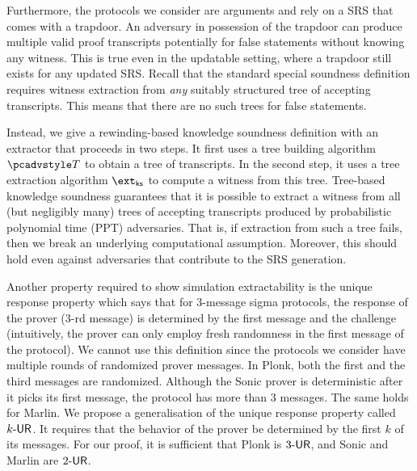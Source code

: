Furthermore, the protocols we consider are arguments and rely on a SRS that comes with a trapdoor. An adversary in
possession of the trapdoor can produce multiple valid proof transcripts potentially for false statements without
knowing any witness. This is true even in
the updatable setting, where a trapdoor still exists for any updated SRS. Recall
that the standard special soundness definition requires witness extraction from
\emph{any} suitably structured tree of accepting transcripts. This means
that there are no such trees for false statements. 

Instead, we give a rewinding-based knowledge soundness definition with an extractor that proceeds in two steps. It first uses a tree building algorithm $\tdv$ to obtain a tree of transcripts. In the second step, it uses a tree extraction algorithm $\extcss$ to compute a witness from this tree. Tree-based knowledge soundness guarantees that it is possible to extract a witness from all
(but negligibly many) trees of accepting transcripts produced by probabilistic
polynomial time (PPT) adversaries. That
is, if extraction from such a tree fails, then we break an underlying
computational assumption. Moreover, this should hold even against adversaries
that contribute to the SRS generation.

  Another property
required to show simulation extractability is the unique response property which says
that for $3$-message sigma protocols, the response of the prover ($3$-rd message) is determined by the first message and the challenge~\cite{C:Fischlin05} (intuitively, the prover can only employ fresh randomness in the first
message of the protocol). We cannot use this definition since the protocols
we consider have multiple rounds of randomized prover messages. In
Plonk, both the first and the third messages are randomized. Although the Sonic prover
is deterministic after it picks its first message, the protocol has more than $3$
messages. The same holds for Marlin. We propose a generalisation of the unique response property called ${k\text{-}\mathsf{UR}}$. It requires that the behavior of the prover be determined by the first
$k$ of its messages. For our proof, it is sufficient that Plonk is ${3\text{-}\mathsf{UR}}$, and Sonic and Marlin are ${2\text{-}\mathsf{UR}}$.


